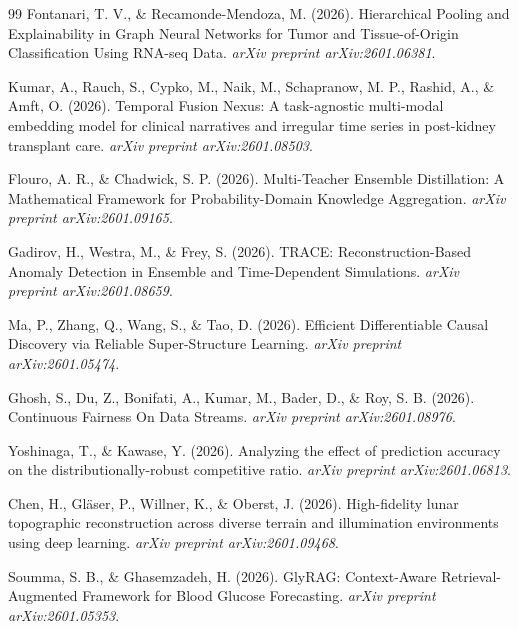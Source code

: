 \documentclass[11pt]{article}
\begin{document}
\begin{thebibliography}{99}
Fontanari, T. V., \& Recamonde-Mendoza, M. (2026). Hierarchical Pooling and Explainability in Graph Neural Networks for Tumor and Tissue-of-Origin Classification Using RNA-seq Data. \emph{arXiv preprint arXiv:2601.06381}.

Kumar, A., Rauch, S., Cypko, M., Naik, M., Schapranow, M. P., Rashid, A., \& Amft, O. (2026). Temporal Fusion Nexus: A task-agnostic multi-modal embedding model for clinical narratives and irregular time series in post-kidney transplant care. \emph{arXiv preprint arXiv:2601.08503}.

Flouro, A. R., \& Chadwick, S. P. (2026). Multi-Teacher Ensemble Distillation: A Mathematical Framework for Probability-Domain Knowledge Aggregation. \emph{arXiv preprint arXiv:2601.09165}.

Gadirov, H., Westra, M., \& Frey, S. (2026). TRACE: Reconstruction-Based Anomaly Detection in Ensemble and Time-Dependent Simulations. \emph{arXiv preprint arXiv:2601.08659}.

Ma, P., Zhang, Q., Wang, S., \& Tao, D. (2026). Efficient Differentiable Causal Discovery via Reliable Super-Structure Learning. \emph{arXiv preprint arXiv:2601.05474}.

Ghosh, S., Du, Z., Bonifati, A., Kumar, M., Bader, D., \& Roy, S. B. (2026). Continuous Fairness On Data Streams. \emph{arXiv preprint arXiv:2601.08976}.

Yoshinaga, T., \& Kawase, Y. (2026). Analyzing the effect of prediction accuracy on the distributionally-robust competitive ratio. \emph{arXiv preprint arXiv:2601.06813}.

Chen, H., Gläser, P., Willner, K., \& Oberst, J. (2026). High-fidelity lunar topographic reconstruction across diverse terrain and illumination environments using deep learning. \emph{arXiv preprint arXiv:2601.09468}.

Soumma, S. B., \& Ghasemzadeh, H. (2026). GlyRAG: Context-Aware Retrieval-Augmented Framework for Blood Glucose Forecasting. \emph{arXiv preprint arXiv:2601.05353}.


\end{thebibliography}
\end{document}
